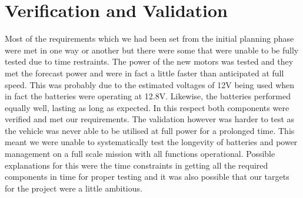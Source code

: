 \section{Verification and Validation}
Most of the requirements which we had been set from the initial planning phase were met in one way or another but there were some that were unable to be fully tested due to time restraints.  
The power of the new motors was tested and they met the forecast power and were in fact a little faster than anticipated at full speed.  This was probably due to the estimated voltages of 12V being used when in fact the batteries were operating at 12.8V.  Likewise, the batteries performed equally well, lasting as long as expected.
In this respect both components were verified and met our requirements.  The validation however was harder to test as the vehicle was never able to be utilised at full power for a prolonged time.  This meant we were unable to systematically test the longevity of batteries and power management on a full scale mission with all functions operational.  Possible explanations for this were the time constraints in getting all the required components in time for proper testing and it was also possible that our targets for the project were a little ambitious.  